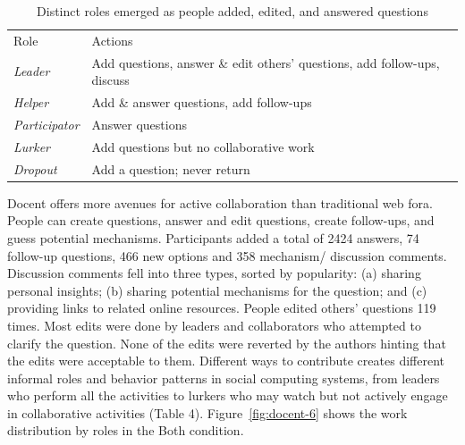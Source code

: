 \vspace{0.25in}
\begin{table}[!ht]
\caption[Distinct roles emerged as people added, edited, and
answered questions]
{Distinct roles emerged as people added, edited, and
answered questions}

\vspace{-0.25in}
\begin{center}
\renewcommand{\arraystretch}{1.5}
\begin{tabular}{p{1in}p{4.5in}}
\hline
Role & Actions\\
\textit{Leader} 		& Add questions, answer \& edit others’ questions, add follow-ups, discuss \\
\textit{Helper} 		&  Add \& answer questions, add follow-ups\\
\textit{Participator} 	&  Answer questions\\
\textit{Lurker} 		&  Add questions but no collaborative work\\
\textit{Dropout} 	&  Add a question; never return\\
\hline
\end{tabular}
\end{center}
\label{d-tab:results2}
\end{table}


Docent offers more avenues for active collaboration than traditional web fora. People can create questions, answer and edit questions, create follow-ups, and guess potential mechanisms. Participants added a total of 2424 answers, 74 follow-up questions, 466 new options and 358 mechanism/ discussion comments. Discussion comments fell into three types, sorted by popularity: (a) sharing personal insights; (b) sharing potential mechanisms for the question; and (c) providing links to related online resources. People edited others’ questions 119 times. Most edits were done by leaders and collaborators who attempted to clarify the question. None of the edits were reverted by the authors hinting that the edits were acceptable to them. Different ways to contribute creates different informal roles and behavior patterns in social computing systems, from leaders who perform all the activities to lurkers who may watch but not actively engage in collaborative activities (Table 4). Figure~\ref{fig:docent-6} shows the work distribution by roles in the Both condition.

